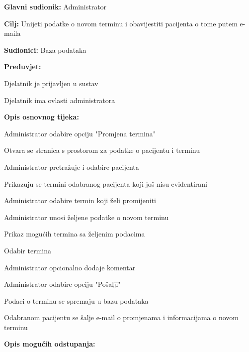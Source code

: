 				\noindent {}
				\begin{packed_item}
					
					\item \textbf{Glavni sudionik: }Administrator
					\item  \textbf{Cilj: }Unijeti podatke o novom terminu i obavijestiti pacijenta o tome putem e-maila 
					\item  \textbf{Sudionici: }Baza podataka
					\item  \textbf{Preduvjet: }
					\item[] \begin{packed_enum}
						
						\item[-] Djelatnik je prijavljen u sustav
						\item[-] Djelatnik ima ovlasti administratora
					\end{packed_enum}
					\item  \textbf{Opis osnovnog tijeka: }
					
					\item[] \begin{packed_enum}
						\item Administrator odabire opciju "Promjena termina"
						\item Otvara se stranica s prostorom za podatke o pacijentu i terminu
						\item Administrator pretražuje i odabire pacijenta
						\item Prikazuju se termini odabranog pacijenta koji još nisu evidentirani
						\item Administrator odabire termin koji želi promijeniti
						\item Administrator unosi željene podatke o novom terminu
						\item Prikaz mogućih termina sa željenim podacima
						\item Odabir termina
						\item Administrator opcionalno dodaje komentar
						\item Administrator odabire opciju "Pošalji"
						\item Podaci o terminu se spremaju u bazu podataka
						\item Odabranom pacijentu se šalje e-mail o promjenama i informacijama o novom terminu
					\end{packed_enum}
					
					\item  \textbf{Opis mogućih odstupanja:}
					

\end{packed_item}

